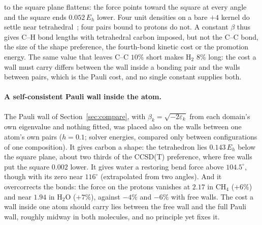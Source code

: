 \documentclass[11pt]{article}
\begin{document}
to the square plane flattens: the force points toward the square at every angle and the square ends
$0.052\,E_h$ lower. Four unit densities on a bare $+4$ kernel do settle near tetrahedral~\cite{chirality}; four
pairs bound to protons do not. A constant $\beta$ thus gives C--H bond lengths with tetrahedral carbon imposed,
but not the C--C bond, the size of the shape preference, the fourth-bond kinetic cost or the promotion energy.
The same value that leaves C--C $10\%$ short makes H$_2$ $8\%$ long: the cost a wall must carry differs between
the wall inside a bonding pair and the walls between pairs, which is the Pauli cost, and no single constant
supplies both.

\paragraph{A self-consistent Pauli wall inside the atom.} The Pauli wall of Section~\ref{sec:compare}, with
$\beta_k = \sqrt{-2\varepsilon_k}$ from each domain's own eigenvalue and nothing fitted, was placed also on the walls
between one atom's own pairs ($h = 0.1$; solver energies, compared only between configurations of one
composition). It gives carbon a shape: the tetrahedron lies $0.143\,E_h$ below the square plane, about two
thirds of the CCSD(T) preference, where free walls put the square $0.002$ lower. It gives water a restoring
bend force above $104.5^\circ$, though with its zero near $116^\circ$ (extrapolated from two angles). And it
overcorrects the bonds: the force on the protons vanishes at $2.17$ in CH$_4$ ($+6\%$) and near $1.94$ in H$_2$O
($+7\%$), against $-4\%$ and $-6\%$ with free walls. The cost a wall inside one atom should carry lies between
the free wall and the full Pauli wall, roughly midway in both molecules, and no principle yet fixes it.
\end{document}
